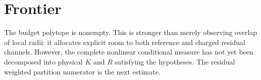 \documentclass[11pt]{article}
\begin{document}
\section{Frontier}
The budget polytope is nonempty.  This is stronger than merely observing
overlap of local radii: it allocates explicit room to both reference and
charged residual channels.  However, the complete nonlinear conditional
measure has not yet been decomposed into physical $K$ and $R$ satisfying the
hypotheses.  The residual weighted partition numerator is the next estimate.
\end{document}
